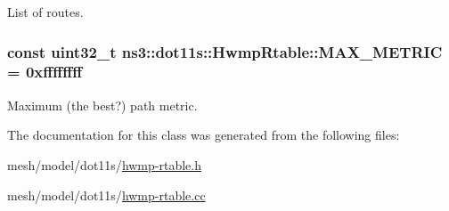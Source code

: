 List of routes. 

\subsubsection[{\texorpdfstring{M\+A\+X\+\_\+\+M\+E\+T\+R\+IC}{MAX_METRIC}}]{\setlength{\rightskip}{0pt plus 5cm}const uint32\+\_\+t ns3\+::dot11s\+::\+Hwmp\+Rtable\+::\+M\+A\+X\+\_\+\+M\+E\+T\+R\+IC = 0xffffffff\hspace{0.3cm}{\ttfamily [static]}}\hypertarget{classns3_1_1dot11s_1_1HwmpRtable_a3aed0da4da63b8109c4cb4eef396428e}{}\label{classns3_1_1dot11s_1_1HwmpRtable_a3aed0da4da63b8109c4cb4eef396428e}


Maximum (the best?) path metric. 



The documentation for this class was generated from the following files\+:\begin{DoxyCompactItemize}
\item 
mesh/model/dot11s/\hyperlink{hwmp-rtable_8h}{hwmp-\/rtable.\+h}\item 
mesh/model/dot11s/\hyperlink{hwmp-rtable_8cc}{hwmp-\/rtable.\+cc}\end{DoxyCompactItemize}
